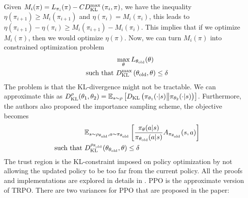 Given $M_i(\pi) = L_{\pi_i}(\pi) - CD_{\mathrm{KL}}^{\max}\left( \pi_i, \pi \right)$, we have the inequality $\eta(\pi_{i+1}) \ge M_i(\pi_{i+1})$ and $\eta(\pi_i) = M_i(\pi_i)$, this leads to $\eta(\pi_{i+1}) - \eta(\pi_i) \ge  M_i(\pi_{i+1}) - M_i(\pi_i)$. This implies that if we optimize $M_i(\pi)$, then we would optimize $\eta(\pi)$. Now, we can turn $M_i(\pi)$ into constrained optimization problem 
\begin{equation}
\begin{aligned}
    &\max_\theta L_{\theta_\text{old}}(\theta) \\
    \text{ such that } &D_{\mathrm{KL}}^{\max}\left( \theta_{\text{old}}, \theta \right) \le \delta
\end{aligned}
\end{equation}
The problem is that the KL-divergence might not be tractable. We can approximate this as $D^\rho_{\text{KL}}(\theta_1, \theta_2) = \mathbb{E}_{s\sim\rho}\left[ D_{\mathrm{KL}}\left( \pi_{\theta_1}(\cdot | s) \big\| \pi_{\theta_2}(\cdot | s) \right) \right]$. Furthermore, the authors also proposed the importance sampling scheme, the objective becomes 
\begin{equation}
\begin{aligned}
    &\mathbb{E}_{s \sim \rho_{\theta_{\text{old}}}, a \sim \pi_{\theta_{\text{old}}}}\left[ \frac{\pi_\theta(a | s)}{\pi_{\theta_{\text{old}}}(a | s)} A_{\pi_{\theta_{\text{old}}}}(s, a) \right] \\
    \text{ such that }& D^{\rho_{\theta_\text{old}}}_{\text{KL}}(\theta_{\theta_\text{old}}, \theta) \le \delta
\end{aligned}
\end{equation}
The trust region is the KL-constraint imposed on policy optimization by not allowing the updated policy to be too far from the current policy. All the proofs and implementations are explored in details in \cite{schulman2015trust}. PPO \cite{schulman2017proximal} is the approximate version of TRPO. There are two variances for PPO that are proposed in the paper:

